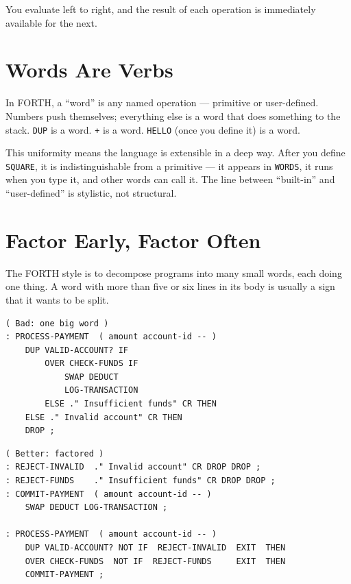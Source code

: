 You evaluate left to right, and the result of each operation is immediately
available for the next.

\section{Words Are Verbs}
\label{sec:words-are-verbs}

In FORTH, a ``word'' is any named operation --- primitive or user-defined.
Numbers push themselves; everything else is a word that does something to the
stack. \texttt{DUP} is a word. \texttt{+} is a word. \texttt{HELLO} (once you
define it) is a word.

This uniformity means the language is extensible in a deep way. After you
define \texttt{SQUARE}, it is indistinguishable from a primitive --- it appears
in \texttt{WORDS}, it runs when you type it, and other words can call it. The
line between ``built-in'' and ``user-defined'' is stylistic, not structural.

\section{Factor Early, Factor Often}
\label{sec:factor}

The FORTH style is to decompose programs into many small words, each doing one
thing. A word with more than five or six lines in its body is usually a sign
that it wants to be split.

\begin{lstlisting}[language=Forth]
( Bad: one big word )
: PROCESS-PAYMENT  ( amount account-id -- )
    DUP VALID-ACCOUNT? IF
        OVER CHECK-FUNDS IF
            SWAP DEDUCT
            LOG-TRANSACTION
        ELSE ." Insufficient funds" CR THEN
    ELSE ." Invalid account" CR THEN
    DROP ;
\end{lstlisting}

\begin{lstlisting}[language=Forth]
( Better: factored )
: REJECT-INVALID  ." Invalid account" CR DROP DROP ;
: REJECT-FUNDS    ." Insufficient funds" CR DROP DROP ;
: COMMIT-PAYMENT  ( amount account-id -- )
    SWAP DEDUCT LOG-TRANSACTION ;

: PROCESS-PAYMENT  ( amount account-id -- )
    DUP VALID-ACCOUNT? NOT IF  REJECT-INVALID  EXIT  THEN
    OVER CHECK-FUNDS  NOT IF  REJECT-FUNDS     EXIT  THEN
    COMMIT-PAYMENT ;
\end{lstlisting}

